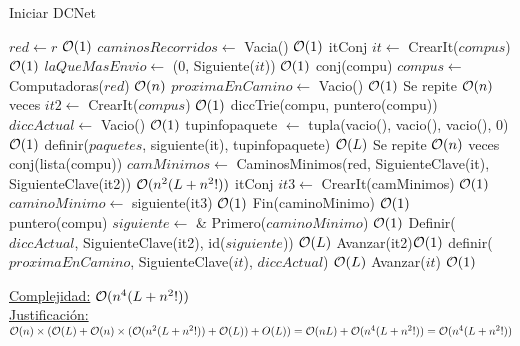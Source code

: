 \newpage
\begin{Algoritmos}


\begin{algorithm}
\caption{Iniciar DCNet}
\begin{algorithmic}[1]
  \State $red \gets r$ \Comment $\mathcal{O}(1)$
  \State $caminosRecorridos \gets$ Vacia() \Comment $\mathcal{O}(1)$ 
  \State itConj $it \gets$ CrearIt($compus$) \Comment $\mathcal{O}(1)$
  \State $laQueMasEnvio \gets$ (0, Siguiente($it$)) \Comment $\mathcal{O}(1)$
  \State conj(compu) $compus \gets$ Computadoras($red$) \Comment $\mathcal{O}(n)$
  \State $proximaEnCamino \gets$ Vacio() \Comment $\mathcal{O}(1)$
   \Comment Se repite $\mathcal{O}(n)$ veces
    \State {} $it2 \gets$ CrearIt($compus$) \Comment $\mathcal{O}(1)$
    \State diccTrie(compu, puntero(compu)) $diccActual \gets$ Vacio() \Comment $\mathcal{O}(1)$
	\State {} tupinfopaquete $\gets$ tupla(vacio(), vacio(), vacio(), 0) \Comment $\mathcal{O}(1)$	
	\State definir($paquetes$, siguiente(it), tupinfopaquete) \Comment $\mathcal{O}(L)$
     \Comment Se repite $\mathcal{O}(n)$ veces
      \State conj(lista(compu)) $camMinimos \gets$ CaminosMinimos(red, SiguienteClave(it), SiguienteClave(it2)) \Comment $\mathcal{O}(n^2(L + n^2!))$
      \State itConj $it3 \gets$ CrearIt(camMinimos) \Comment $\mathcal{O}(1)$
      \State $caminoMinimo \gets$ siguiente(it3) \Comment $\mathcal{O}(1)$
      \State Fin(caminoMinimo) \Comment $\mathcal{O}(1)$
      \State puntero(compu) $siguiente \gets$ \& Primero($caminoMinimo$) \Comment $\mathcal{O}(1)$
      \State Definir($diccActual$, SiguienteClave(it2), id($siguiente$)) \Comment $\mathcal{O}(L)$
      \State Avanzar(it2)\Comment $\mathcal{O}(1)$
    \EndWhile
    \State definir($proximaEnCamino$, SiguienteClave($it$), $diccActual$) \Comment $\mathcal{O}(L)$
    \State Avanzar($it$) \Comment $\mathcal{O}(1)$
  \EndWhile
   
  \EndProcedure 
\end{algorithmic}
\underline{Complejidad:} $\mathcal{O}(n^4(L + n^2!))$ \\
 \underline{Justificación:} $\mathcal{O}(n)\times(\mathcal{O}(L) + \mathcal{O}(n)\times(\mathcal{O}(n^2 (L+n^2!)) + \mathcal{O}(L)) + O(L)) = \mathcal{O}(nL) + \mathcal{O}(n^4(L + n^2!)) =   \mathcal{O}(n^4(L + n^2!))$
\end{algorithm}



\end{Algoritmos}
